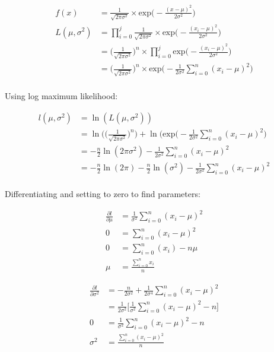 \documentclass[10pt,a4paper]{article}
\begin{document}
\begin{align*}
	f(x) &= \frac{1}{\sqrt{2\pi\sigma^2}} \times \text{exp}\bigg(-\frac{(x-\mu)^2}{2\sigma^2}\bigg)\\
	L(\mu, \sigma^2) &= \prod_{i=0}^{j} \frac{1}{\sqrt{2\pi\sigma^2}} \times \text{exp}\bigg(-\frac{(x_i-\mu)^2}{2\sigma^2}\bigg)\\
	&= \bigg(\frac{1}{\sqrt{2\pi\sigma^2}}\bigg)^n \times \prod_{i=0}^{j} \text{exp}\bigg(-\frac{(x_i-\mu)^2}{2\sigma^2}\bigg)\\
	&= \bigg(\frac{1}{\sqrt{2\pi\sigma^2}}\bigg)^n \times \text{exp}\bigg(-\frac{1}{2\sigma^2}\sum_{i=0}^{n}(x_i-\mu)^2\bigg)\\
\end{align*}

Using log maximum likelihood:

\begin{align*}
	l(\mu, \sigma^2) &= \ln (L(\mu, \sigma^2)) \\
	&= \ln \bigg(\bigg(\frac{1}{\sqrt{2\pi\sigma^2}}\bigg)^n\bigg) + \ln \bigg(\text{exp}\bigg(-\frac{1}{2\sigma^2}\sum_{i=0}^{n}(x_i-\mu)^2\bigg) \\
	&= -\frac{n}{2} \ln (2\pi\sigma^2) - \frac{1}{2\sigma^2}\sum_{i=0}^{n}(x_i - \mu)^2 \\
	&= -\frac{n}{2} \ln (2\pi) - \frac{n}{2} \ln (\sigma^2) - \frac{1}{2\sigma^2}\sum_{i=0}^{n}(x_i - \mu)^2 \\
\end{align*}

Differentiating and setting to zero to find parameters:

\begin{align*}
	\frac{\partial l}{\partial \mu} &= \frac{1}{\sigma^2} \sum_{i=0}^{n}(x_i-\mu)^2\\
	0 &= \sum_{i=0}^{n}(x_i-\mu)^2\\
	0 &= \sum_{i=0}^{n}(x_i)- n\mu\\
	\mu &= \frac{\sum_{i=0}^{n}x_i}{n}
\end{align*}

\begin{align*}
	\frac{\partial l}{\partial \sigma^2} &= -\frac{n}{2\sigma^2} + \frac{1}{2\sigma^4} \sum_{i=0}^{n}(x_i-\mu)^2\\
	&= \frac{1}{2\sigma^2}\bigg[\frac{1}{\sigma^2}\sum_{i=0}^{n}(x_i-\mu)^2 - n\bigg]\\
	0 &= \frac{1}{\sigma^2}\sum_{i=0}^{n}(x_i-\mu)^2 - n \\
	\sigma^2 &= \frac{\sum_{i=0}^{n}(x_i-\mu)^2}{n}\\
\end{align*}
\end{document}
